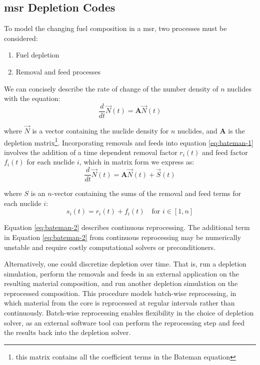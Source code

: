 \documentclass[letterpaper]{mc2023}
\begin{document}
\subsection{\Gls{msr} Depletion Codes}%
\label{sec:msr_codes}

To model the changing fuel composition in a \Gls{msr}, two
processes must be considered:
\begin{enumerate}
    \item Fuel depletion
    \item Removal and feed processes
\end{enumerate}

We can concisely describe the rate of change of the number density of $n$ nuclides with the equation:
\begin{equation}
    \label{eq:bateman-1}
    \frac{d}{dt}\vec{N}(t) = \mathbf{A}\vec{N}(t)
\end{equation}

where $\vec{N}$ is a vector containing the nuclide density for $n$ nuclides, and
$\mathbf{A}$ is the depletion matrix\footnote{this matrix contains all the
coefficient terms in the Bateman equation}. Incorporating removals and feeds
into equation \ref{eq:bateman-1} involves the addition of a time dependent
removal factor $r_{i}(t)$ and feed factor $f_{i}(t)$ for each nuclide $i$, which
in matrix form we express as:
\begin{equation}
    \label{eq:bateman-2}
    \frac{d}{dt}\vec{N}(t) = \mathbf{A}\vec{N}(t) + \vec{S}(t)
\end{equation}

where $S$ is an $n$-vector containing the sums of the removal and feed terms
for each nuclide $i$:
\begin{equation}
    \label{eq:s}
s_{i}(t) = r_{i}(t) + f_{i}(t) \quad \text{for } i\in[1,n]
\end{equation}

Equation \ref{eq:bateman-2} describes continuous reprocessing.
The additional term in Equation \ref{eq:bateman-2} from continuous reprocessing
may be numerically unstable and require costly computational solvers or
preconditioners.

Alternatively, one could discretize depletion over time. That is,
run a depletion simulation, perform the removals and feeds in an
external application on the resulting material composition, and run
another depletion simulation on the reprocessed composition. This procedure
models batch-wise reprocessing, in which material from the core is
reprocessed at regular intervals rather than continuously. Batch-wise
reprocessing enables flexibility in the choice of depletion solver, as an
external software tool can perform the reprocessing step and feed the results
back into the depletion solver.
\end{document}
